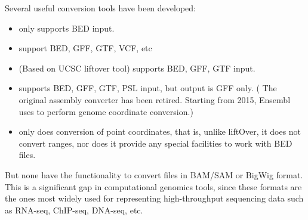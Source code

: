 \documentclass[letterpaper,10pt,english]{sphinxmanual}
\begin{document}
Several useful conversion tools have been developed:
\begin{itemize}
\item {} 
 only supports BED input.

\item {} 
 support BED, GFF, GTF, VCF, etc

\item {} 
 (Based on UCSC liftover tool) supports BED, GFF, GTF input.

\item {} 
supports BED, GFF, GTF, PSL input, but output is GFF only. ( The original \sphinxquotedblleft{}assembly converter\sphinxquotedblright{} has been retired. Starting from 2015, Ensembl uses  to perform genome coordinate conversion.)

\item {} 
 \sphinxquotedblleft{}only does conversion of point
coordinates, that is, unlike liftOver, it does not convert ranges, nor does it provide any
special facilities to work with BED files\sphinxquotedblright{}.

\end{itemize}

But none have the functionality to convert files in BAM/SAM or BigWig format. This is a significant
gap in computational genomics tools, since these formats are the ones most widely used
for representing high-throughput sequencing data such as RNA-seq, ChIP-seq, DNA-seq, etc.
\end{document}

